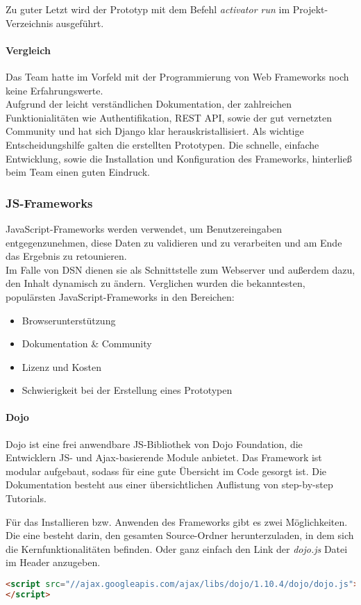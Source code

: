 Zu guter Letzt wird der Prototyp mit dem Befehl \textit{activator run} im Projekt-Verzeichnis ausgeführt.

\paragraph{Vergleich}
Das Team hatte im Vorfeld mit der Programmierung von Web Frameworks noch keine Erfahrungswerte. \\
Aufgrund der leicht verständlichen Dokumentation, der zahlreichen Funktionialitäten wie Authentifikation, REST API, sowie der gut vernetzten Community und hat sich Django klar herauskristallisiert. Als wichtige Entscheidungshilfe galten die erstellten Prototypen. Die schnelle, einfache Entwicklung, sowie die Installation und Konfiguration des Frameworks, hinterließ beim Team einen guten Eindruck.

\newpage

\subsubsection{JS-Frameworks}
JavaScript-Frameworks werden verwendet, um Benutzereingaben entgegenzunehmen, diese Daten zu validieren und zu verarbeiten und am Ende das Ergebnis zu retounieren.\\
Im Falle von DSN dienen sie als Schnittstelle zum Webserver und außerdem dazu, den Inhalt dynamisch zu ändern. Verglichen wurden die bekanntesten, populärsten JavaScript-Frameworks in den Bereichen:
\begin{itemize}
\item Browserunterstützung
\item Dokumentation \& Community
\item Lizenz und Kosten
\item Schwierigkeit bei der Erstellung eines Prototypen
\end{itemize}
\paragraph{Dojo}
Dojo ist eine frei anwendbare JS-Bibliothek von Dojo Foundation, die Entwicklern JS- und Ajax-basierende Module anbietet. Das Framework ist modular aufgebaut, sodass für eine gute Übersicht im Code gesorgt ist. Die Dokumentation besteht aus einer übersichtlichen Auflistung von step-by-step Tutorials. \cite{DOJO}

Für das Installieren bzw. Anwenden des Frameworks gibt es zwei Möglichkeiten. Die eine besteht darin, den gesamten Source-Ordner herunterzuladen, in dem sich die Kernfunktionalitäten befinden. Oder ganz einfach den Link der \textit{dojo.js} Datei im Header anzugeben.
\begin{lstlisting}[caption={Dojo einbinden\cite{DOJODOWN}}, language=HTML]
<script src="//ajax.googleapis.com/ajax/libs/dojo/1.10.4/dojo/dojo.js">
</script>
\end{lstlisting}

